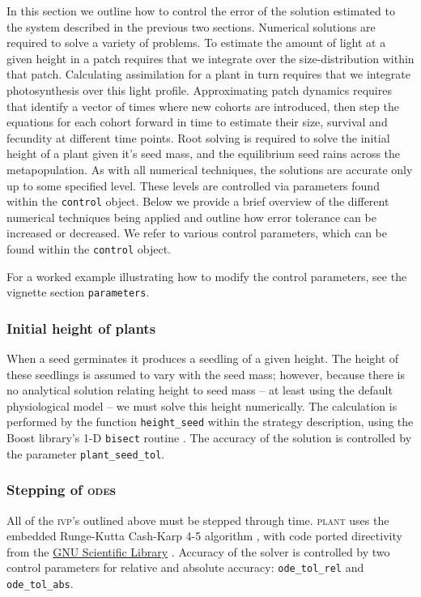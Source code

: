 \documentclass[10pt,twoside]{article}
\newcommand{\plant}{\textsc{plant}}
\begin{document}
In this section we outline how to control the error of the solution
estimated to the system described in the previous two sections.
Numerical solutions are required to solve a variety of problems. To
estimate the amount of light at a given height in a patch requires that
we integrate over the size-distribution within that patch. Calculating
assimilation for a plant in turn requires that we integrate
photosynthesis over this light profile. Approximating patch dynamics
requires that identify a vector of times where new cohorts are
introduced, then step the equations for each cohort forward in time to
estimate their size, survival and fecundity at different time points.
Root solving is required to solve the initial height of a plant given
it's seed mass, and the equilibrium seed rains across the
metapopulation. As with all numerical techniques, the solutions are
accurate only up to some specified level. These levels are controlled
via parameters found within the \texttt{control} object. Below we
provide a brief overview of the different numerical techniques being
applied and outline how error tolerance can be increased or decreased.
We refer to various control parameters, which can be found within the
\texttt{control} object.

For a worked example illustrating how to modify the control parameters,
see the vignette section \texttt{parameters}.

\subsubsection{Initial height of plants}\label{initial-height-of-plants}

When a seed germinates it produces a seedling of a given height. The
height of these seedlings is assumed to vary with the seed mass;
however, because there is no analytical solution relating height to seed
mass -- at least using the default physiological model -- we must solve
this height numerically. The calculation is performed by the function
\texttt{height\_seed} within the strategy description, using the Boost
library's 1-D \texttt{bisect} routine
\citep{Schaling-2014, Eddelbuettel-2015}. The accuracy of the solution
is controlled by the parameter \texttt{plant\_seed\_tol}.

\subsubsection{Stepping of \textsc{ode}s}

All of the \textsc{ivp}'s outlined above must be stepped through time.
{\plant} uses
the embedded Runge-Kutta Cash-Karp 4-5 algorithm \citep{Cash-1990}, with
code ported directivity from the
\href{http://www.gnu.org/software/gsl/}{GNU Scientific Library}
\citep{Galassi-2009}. Accuracy of the solver is controlled by two
control parameters for relative and absolute accuracy:
\texttt{ode\_tol\_rel} and \texttt{ode\_tol\_abs}.
\end{document}
